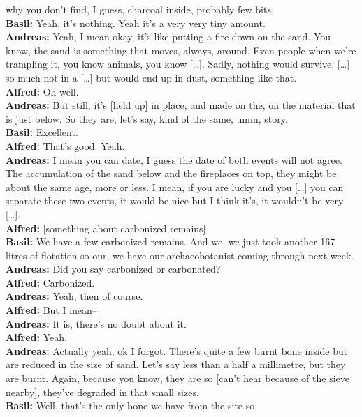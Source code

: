 \documentclass[
  canadian,
]{article}
\begin{document}
why you don't find, I guess, charcoal inside, probably few bits.\\
\textbf{Basil:} Yeah, it's nothing. Yeah it's a very very tiny amount.\\
\textbf{Andreas:} Yeah, I mean okay, it's like putting a fire down on
the sand. You know, the sand is something that moves, always, around.
Even people when we're trampling it, you know animals, you know
{[}\ldots{]}. Sadly, nothing would survive, {[}\ldots{]} so much not in
a {[}\ldots{]} but would end up in dust, something like that.\\
\textbf{Alfred:} Oh well.\\
\textbf{Andreas:} But still, it's {[}held up{]} in place, and made on
the, on the material that is just below. So they are, let's say, kind of
the same, umm, story.\\
\textbf{Basil:} Excellent.\\
\textbf{Alfred:} That's good. Yeah.\\
\textbf{Andreas:} I mean you can date, I guess the date of both events
will not agree. The accumulation of the sand below and the fireplaces on
top, they might be about the same age, more or less. I mean, if you are
lucky and you {[}\ldots{]} you can separate these two events, it would
be nice but I think it's, it wouldn't be very {[}\ldots{]}.\\
\textbf{Alfred:} {[}something about carbonized remains{]}\\
\textbf{Basil:} We have a few carbonized remains. And we, we just took
another 167 litres of flotation so our, we have our archaeobotanist
coming through next week.\\
\textbf{Andreas:} Did you say carbonized or carbonated?\\
\textbf{Alfred:} Carbonized.\\
\textbf{Andreas:} Yeah, then of course.\\
\textbf{Alfred:} But I mean--\\
\textbf{Andreas:} It is, there's no doubt about it.\\
\textbf{Alfred:} Yeah.\\
\textbf{Andreas:} Actually yeah, ok I forgot. There's quite a few burnt
bone inside but are reduced in the size of sand. Let's say less than a
half a millimetre, but they are burnt. Again, because you know, they are
so {[}can't hear because of the sieve nearby{]}, they've degraded in
that small sizes.\\
\textbf{Basil:} Well, that's the only bone we have from the site so
\end{document}
